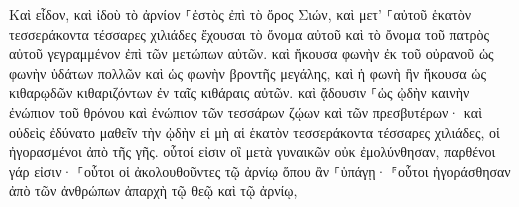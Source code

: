 \documentclass{openreader}
\begin{document}
Καὶ εἶδον, καὶ ἰδοὺ τὸ ἀρνίον ⸀ἑστὸς ἐπὶ τὸ ὄρος Σιών, καὶ μετ’ ⸀αὐτοῦ ἑκατὸν τεσσεράκοντα τέσσαρες χιλιάδες ἔχουσαι τὸ ὄνομα αὐτοῦ καὶ τὸ ὄνομα τοῦ πατρὸς αὐτοῦ γεγραμμένον ἐπὶ τῶν μετώπων αὐτῶν. 
καὶ ἤκουσα φωνὴν ἐκ τοῦ οὐρανοῦ ὡς φωνὴν ὑδάτων πολλῶν καὶ ὡς φωνὴν βροντῆς μεγάλης, καὶ ἡ φωνὴ ἣν ἤκουσα ὡς κιθαρῳδῶν κιθαριζόντων ἐν ταῖς κιθάραις αὐτῶν. 
καὶ ᾄδουσιν ⸀ὡς ᾠδὴν καινὴν ἐνώπιον τοῦ θρόνου καὶ ἐνώπιον τῶν τεσσάρων ζῴων καὶ τῶν πρεσβυτέρων· καὶ οὐδεὶς ἐδύνατο μαθεῖν τὴν ᾠδὴν εἰ μὴ αἱ ἑκατὸν τεσσεράκοντα τέσσαρες χιλιάδες, οἱ ἠγορασμένοι ἀπὸ τῆς γῆς. 
οὗτοί εἰσιν οἳ μετὰ γυναικῶν οὐκ ἐμολύνθησαν, παρθένοι γάρ εἰσιν· ⸀οὗτοι οἱ ἀκολουθοῦντες τῷ ἀρνίῳ ὅπου ἂν ⸀ὑπάγῃ· ⸁οὗτοι ἠγοράσθησαν ἀπὸ τῶν ἀνθρώπων ἀπαρχὴ τῷ θεῷ καὶ τῷ ἀρνίῳ, 
\end{document}
